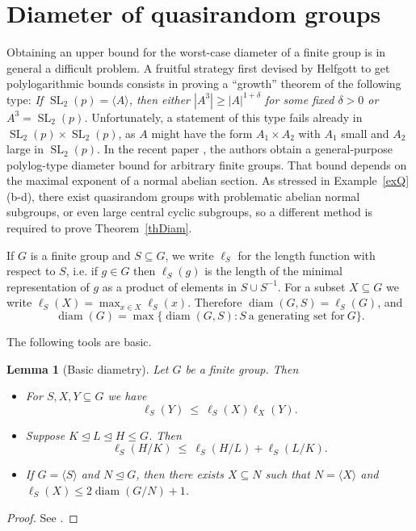 \documentclass[11pt,reqno]{amsart}
\numberwithin{equation}{section}
\newtheorem{lemma}[theorem]{Lemma}
\theoremstyle{definition}
\theoremstyle{remark}
\newcommand{\SL}{\mathop{\mathrm{SL}}}
\newcommand{\diam}{\mathop{\mathrm{diam}}}
\begin{document}
\section{Diameter of quasirandom groups}  \label{secDia}

Obtaining an upper bound for the worst-case diameter of a finite group is in general a difficult problem.
A fruitful strategy first devised by Helfgott \cite{Hel08} to get polylogarithmic bounds consists
in proving a ``growth'' theorem of the following type:
\emph{If $\SL_2(p) = \langle A \rangle$,
then either $|A^3| \geq |A|^{1+\delta}$ for some fixed $\delta>0$ or $A^3=\SL_2(p)$.}
Unfortunately, a statement of this type fails already in $\SL_2(p) \times \SL_2(p)$,
as $A$ might have the form $A_1 \times A_2$ with $A_1$ small and $A_2$ large in $\SL_2(p)$.
In the recent paper \cite{EMST26},
the authors obtain a general-purpose polylog-type diameter bound for arbitrary finite groups.
That bound depends on the maximal exponent of a normal abelian section.
As stressed in Example~\ref{exQ}(b-d),
there exist quasirandom groups with problematic abelian normal subgroups,
or even large central cyclic subgroups,
so a different method is required to prove Theorem~\ref{thDiam}.

If $G$ is a finite group and $S \subseteq G$, we write $\ell_S$ for the length function with respect to $S$,
i.e. if $g \in G$ then $\ell_S(g)$ is the length of the minimal representation of $g$ as a product of elements in $S \cup S^{-1}$.
    For a subset $X \subseteq G$ we write $\ell_S(X) = \max_{x \in X} \ell_S(x)$.
    Therefore $\diam(G, S) = \ell_S(G)$, and
    $$ \diam(G) = \max \{\diam(G, S) : S~\text{a generating set for}~G\} . $$
    
    The following tools are basic.

\begin{lemma}[Basic diametry] \label{lemDiamTools}
Let $G$ be a finite group. Then
\begin{itemize}
\item[(i)] For $S, X, Y \subseteq G$ we have
   $$ \ell_S(Y) \> \leq \> \ell_S(X) \ell_X(Y) . $$
    
    \item[(ii)] Suppose $K \unlhd L \unlhd H \leqslant G$. Then
    $$ \ell_S(H/K) \> \leq \> \ell_S(H/L) + \ell_S(L/K) . $$
    
    \item[(iii)] If $G = \langle S \rangle$ and $N \unlhd G$,
   then there exists $X \subseteq N$ such that $N = \langle X \rangle$ and $\ell_S(X) \leq 2 \diam(G/N) + 1$.
\end{itemize}
\end{lemma}
\begin{proof}
See \cite[Section~2]{EMST26}.
\end{proof}
\end{document}
